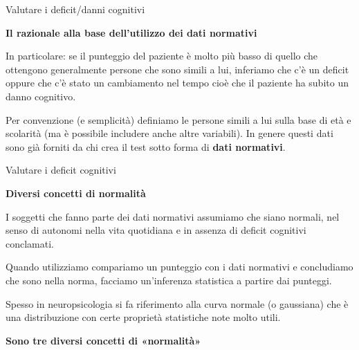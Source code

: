 \documentclass[
  ignorenonframetext,
]{beamer}
\begin{document}
\begin{frame}{Valutare i deficit/danni cognitivi}
\label{valutare-i-deficitdanni-cognitivi-2}
\begin{center}
  \textbf{Il razionale alla base dell’utilizzo dei dati normativi}
\end{center}

In particolare: se il punteggio del paziente è molto più basso di quello
che ottengono generalmente persone che sono simili a lui, inferiamo che
c'è un deficit oppure che c'è stato un cambiamento nel tempo cioè che il
paziente ha subito un danno cognitivo.

Per convenzione (e semplicità) definiamo le persone simili a lui sulla
base di età e scolarità (ma è possibile includere anche altre
variabili). In genere questi dati sono già forniti da chi crea il test
sotto forma di \textbf{dati normativi}.
\end{frame}

\begin{frame}{Valutare i deficit cognitivi}
\label{valutare-i-deficit-cognitivi-3}
\begin{center}
  \textbf{Diversi concetti di normalità}
\end{center}

I soggetti che fanno parte dei dati normativi assumiamo che siano
normali, nel senso di autonomi nella vita quotidiana e in assenza di
deficit cognitivi conclamati.

Quando utilizziamo compariamo un punteggio con i dati normativi e
concludiamo che sono nella norma, facciamo un'inferenza statistica a
partire dai punteggi.

Spesso in neuropsicologia si fa riferimento alla curva normale (o
gaussiana) che è una distribuzione con certe proprietà statistiche note
molto utili.

\begin{center}
  \textbf{Sono tre diversi concetti di «normalità»}
\end{center}
\end{frame}
\end{document}
